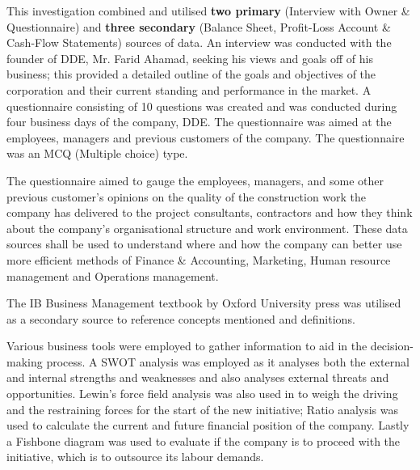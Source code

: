 {This investigation combined and utilised \textbf{two primary} (Interview with Owner \& Questionnaire) and \textbf{three secondary} (Balance Sheet, Profit-Loss Account \& Cash-Flow Statements) sources of data. An interview was conducted with the founder of DDE, Mr. Farid Ahamad, seeking his views and goals off of his business; this provided a detailed outline of the goals and objectives of the corporation and their current standing and performance in the market. A questionnaire consisting of 10 questions was created and was conducted during four business days of the company, DDE. The questionnaire was aimed at the employees, managers and previous customers of the company. The questionnaire was an MCQ (Multiple choice) type.}

{The questionnaire aimed to gauge the employees, managers, and some other previous customer's opinions on the quality of the construction work the company has delivered to the project consultants, contractors and how they think about the company's organisational structure and work environment. These data sources shall be used to understand where and how the company can better use more efficient methods of Finance & Accounting, Marketing, Human resource management and Operations management.}

{The IB Business Management textbook by Oxford University press was utilised as a secondary source to reference concepts mentioned and definitions.}

{Various business tools were employed to gather information to aid in the decision-making process. A SWOT analysis was employed as it analyses both the external and internal strengths and weaknesses and also analyses external threats and opportunities. Lewin's force field analysis was also used in to weigh the driving and the restraining forces for the start of the new initiative; Ratio analysis was used to calculate the current and future financial position of the company. Lastly a Fishbone diagram was used to evaluate if the company is to proceed with the initiative, which is to outsource its labour demands.}


